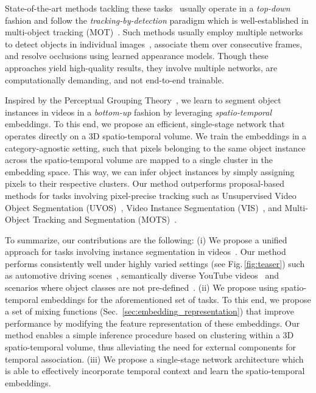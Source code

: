 \documentclass[runningheads]{llncs}
\newcommand{\reffig}[1]{Fig.\,\ref{fig:#1}}
\begin{document}
State-of-the-art methods tackling these tasks~\cite{Voigtlaender19CVPR,Wang19ICCVW,Yang19ICCV} usually operate in a \textit{top-down} fashion and follow the \textit{tracking-by-detection} paradigm which is well-established in multi-object tracking (MOT)~\cite{ButtCollins13CVPR,Huang08ECCV,Leibe08TPAMI,Okuma04ECCV}. Such methods usually employ multiple networks to detect objects in individual images~\cite{He17ICCV}, associate them over consecutive frames, and resolve occlusions using learned appearance models.
Though these approaches yield high-quality results, they involve multiple networks, are computationally demanding, and not end-to-end trainable. 

Inspired by the Perceptual Grouping Theory~\cite{Palmer02}, 
we learn to segment object instances in videos in a \textit{bottom-up} fashion by leveraging \emph{spatio-temporal} embeddings. To this end, 
we propose an efficient, single-stage network that operates directly on a 3D spatio-temporal volume.
We train the embeddings in a category-agnostic setting, such that pixels belonging to the same object instance across the spatio-temporal volume are mapped to a single cluster in the embedding space.
This way, we can infer object instances by simply assigning pixels to their respective clusters.
Our method outperforms proposal-based methods for tasks involving pixel-precise tracking such as Unsupervised Video Object Segmentation (UVOS)~\cite{Caelles17CVPR,Caelles19arXiv}, Video Instance Segmentation (VIS)~\cite{Yang19ICCV}, and Multi-Object Tracking and Segmentation (MOTS)~\cite{Voigtlaender19CVPR}. 

To summarize, our contributions are the following: (i) We propose a unified approach for tasks involving instance segmentation in videos~\cite{Caelles19arXiv,Voigtlaender19CVPR,Yang19ICCV}. Our method performs consistently well under highly varied settings (see \reffig{teaser}) such as automotive driving scenes~\cite{Voigtlaender19CVPR}, semantically diverse YouTube videos~\cite{Yang19ICCV} and scenarios where object classes are not pre-defined~\cite{Caelles19arXiv}.
(ii) We propose using spatio-temporal embeddings for the aforementioned set of tasks. To this end, we propose a set of mixing functions (Sec.~\ref{sec:embedding_representation}) that improve performance by modifying the feature representation of these embeddings. Our method enables a simple inference procedure based on clustering within a 3D spatio-temporal volume, thus alleviating the need for external components for temporal association.
(iii) We propose a single-stage network architecture which is able to effectively incorporate temporal context and learn the spatio-temporal embeddings.
 
\end{document}
